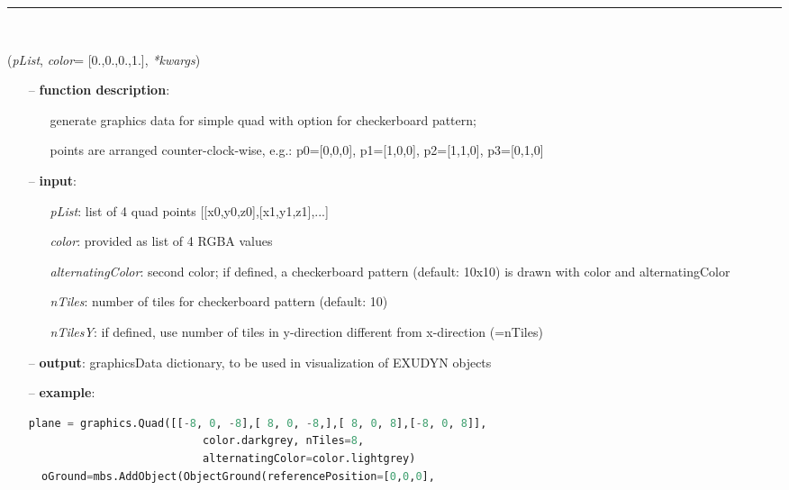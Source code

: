 \begin{itemize}[leftmargin=1.4cm]
\begin{itemize}[leftmargin=1.4cm]
\begin{itemize}[leftmargin=1.4cm]
\begin{itemize}[leftmargin=0.5cm]
\begin{itemize}[leftmargin=1.4cm]
\begin{itemize}[leftmargin=1.4cm]
\begin{itemize}[leftmargin=1.4cm]
\begin{itemize}[leftmargin=0.5cm]
\begin{itemize}[leftmargin=1.4cm]
%
\noindent\rule{8cm}{0.75pt}\vspace{1pt} \\ 
\begin{flushleft}
\label{sec:graphics:Quad}
({\it pList}, {\it color}= [0.,0.,0.,1.], {\it **kwargs})
\end{flushleft}
\setlength{\itemindent}{0.7cm}
\begin{itemize}[leftmargin=0.7cm]
\item[--]
{\bf function description}: \vspace{-6pt}
\begin{itemize}[leftmargin=1.2cm]
\setlength{\itemindent}{-0.7cm}
\item[]generate graphics data for simple quad with option for checkerboard pattern;
\item[]points are arranged counter-clock-wise, e.g.: p0=[0,0,0], p1=[1,0,0], p2=[1,1,0], p3=[0,1,0]
\end{itemize}
\item[--]
{\bf input}: \vspace{-6pt}
\begin{itemize}[leftmargin=1.2cm]
\setlength{\itemindent}{-0.7cm}
\item[]{\it pList}: list of 4 quad points [[x0,y0,z0],[x1,y1,z1],...]
\item[]{\it color}: provided as list of 4 RGBA values
\item[]{\it alternatingColor}: second color; if defined, a checkerboard pattern (default: 10x10) is drawn with color and alternatingColor
\item[]{\it nTiles}: number of tiles for checkerboard pattern (default: 10)
\item[]{\it nTilesY}: if defined, use number of tiles in y-direction different from x-direction (=nTiles)
\end{itemize}
\item[--]
{\bf output}: graphicsData dictionary, to be used in visualization of EXUDYN objects
\item[--]
{\bf example}: \vspace{-12pt}\ei\begin{lstlisting}[language=Python, xleftmargin=36pt]
  plane = graphics.Quad([[-8, 0, -8],[ 8, 0, -8,],[ 8, 0, 8],[-8, 0, 8]],
                           color.darkgrey, nTiles=8,
                           alternatingColor=color.lightgrey)
  oGround=mbs.AddObject(ObjectGround(referencePosition=[0,0,0],

\end{lstlisting}
\end{itemize}
\end{itemize}
\end{itemize}
\end{itemize}
\end{itemize}
\end{itemize}
\end{itemize}
\end{itemize}
\end{itemize}
\end{itemize}
